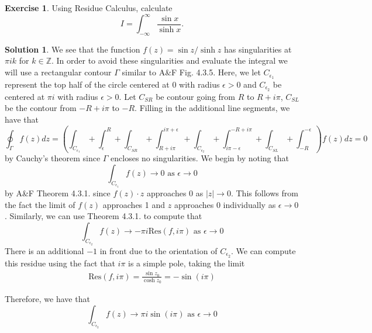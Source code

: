 \documentclass[12pt]{article}
\newcommand{\bbZ}{\mathbb{Z}}
\newcommand{\abs}[1]{ \left| #1 \right| }
\newcommand{\Res}{\text{Res}}
\theoremstyle{definition}
\newtheorem{exer}{Exercise}
\newtheorem{sol}{Solution}
\theoremstyle{remark}
\begin{document}
\begin{exer}
Using Residue Calculus, calculate
\begin{equation}
    I = \int_{-\infty}^{\infty} \frac{\sin x}{\sinh x}. 
\end{equation}
\end{exer}
 
\begin{sol}
    We see that the function $f(z) = \sin z / \sinh z$ has singularities at $\pi i k$ for $k\in\bbZ$. In order to avoid these singularities and evaluate the integral we will use a rectangular contour $\Gamma$ similar to A\&F Fig. 4.3.5. Here, we let $C_{\epsilon_1}$ represent the top half of the circle centered at 0 with radius $\epsilon>0$ and $C_{\epsilon_2}$ be centered at $\pi i$ with radius $\epsilon>0$. Let $C_{SR}$ be contour going from $R$ to $R+i\pi$, $C_{SL}$ be the contour from $-R + i\pi$ to $-R$. Filling in the additional line segments, we have that
\begin{equation}
    \oint_{\Gamma} f(z) dz = \left( \int_{C_{\epsilon_1}} + \int_{\epsilon}^{R} + \int_{C_{SR}} + \int_{R+i\pi}^{i\pi+\epsilon} +  \int_{C_{\epsilon_2}} + \int_{i\pi - \epsilon}^{-R + i\pi} + \int_{C_{SL}} + \int_{-R}^{-\epsilon} \right) f(z)dz = 0
    \end{equation}
    by Cauchy's theorem since $\Gamma$ encloses no singularities. We begin by noting that 
    \begin{equation}
        \int_{C_{\epsilon_1}} f(z) \to 0 \text{ as } \epsilon \to 0 
    \end{equation}
    by A\&F Theorem 4.3.1. since $f(z)\cdot z$ approaches $0$ as $\abs{z} \to 0$. This follows from the fact the limit of $f(z)$ approaches 1 and $z$ approaches 0 individually as $\epsilon \to 0$. Similarly, we can use Theorem 4.3.1. to compute that 
    \begin{equation}
        \int_{C_{\epsilon_2}} f(z) \to -\pi i \Res(f, i\pi) \text{ as } \epsilon \to 0 
    \end{equation}
    There is an additional $-1$ in front due to the orientation of $C_{\epsilon_2}$.
    We can compute this residue using the fact that $i\pi$ is a simple pole, taking the limit
    \begin{align}
    \Res(f, i\pi) = \frac{\sin z_0}{\cosh z_0} =  - \sin(i\pi)  
    \end{align}

    Therefore, we have that 
    \begin{equation}
        \int_{C_{\epsilon_2}} f(z) \to \pi i \sin(i\pi) \text{ as } \epsilon \to 0 
    \end{equation}


\end{sol}
\end{document}
